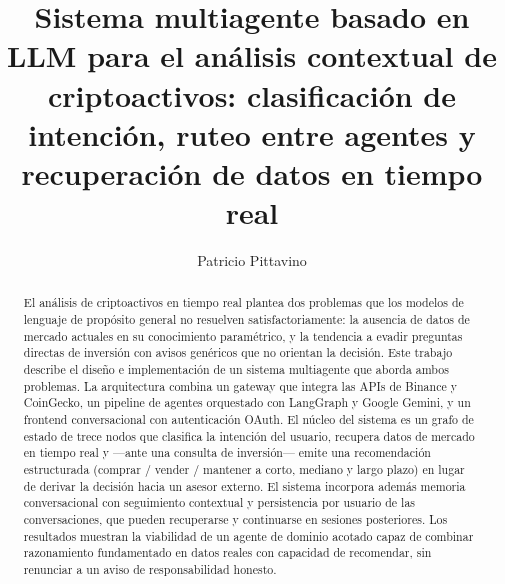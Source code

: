 \documentclass[runningheads]{llncs}
\begin{document}
\title{Sistema multiagente basado en LLM para el análisis contextual de
criptoactivos: clasificación de intención, ruteo entre agentes y recuperación de
datos en tiempo real}


\author{Patricio Pittavino}


\maketitle

\begin{abstract}
El análisis de criptoactivos en tiempo real plantea dos problemas que los modelos de
lenguaje de propósito general no resuelven satisfactoriamente: la ausencia de datos de
mercado actuales en su conocimiento paramétrico, y la tendencia a evadir preguntas
directas de inversión con avisos genéricos que no orientan la decisión. Este trabajo
describe el diseño e implementación de un sistema multiagente que aborda ambos problemas.
La arquitectura combina un gateway que integra las APIs de Binance y CoinGecko, un
pipeline de agentes orquestado con LangGraph y Google Gemini, y un frontend conversacional
con autenticación OAuth. El núcleo del sistema es un grafo de estado de trece nodos que
clasifica la intención del usuario, recupera datos de mercado en tiempo real y —ante una
consulta de inversión— emite una recomendación estructurada (comprar / vender / mantener
a corto, mediano y largo plazo) en lugar de derivar la decisión hacia un asesor externo.
El sistema incorpora además memoria conversacional con seguimiento contextual y
persistencia por usuario de las conversaciones, que pueden recuperarse y continuarse en
sesiones posteriores. Los resultados muestran la viabilidad de un agente de dominio acotado
capaz de combinar razonamiento fundamentado en datos reales con capacidad de recomendar,
sin renunciar a un aviso de responsabilidad honesto.

\end{abstract}
\end{document}
